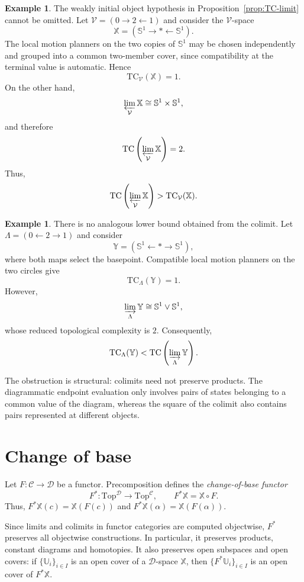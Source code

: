 \documentclass[12pt]{amsart}
\theoremstyle{definition}
\newtheorem{ex}[teo]{Example}
\theoremstyle{remark}
\numberwithin{figure}{section}%
\newcommand{\CC}{\mathcal{C}}
\newcommand{\TC}{\mathrm{TC}}
\newcommand{\Dc}{\mathcal{D}}
\newcommand{\Top}{\mathrm{Top}}
\newcommand{\X}{\mathbb{X}}
\newcommand{\Y}{\mathbb{Y}}
\newcommand{\Uu}{\mathbb{U}}
\begin{document}
\begin{ex}\label{ex:inverse-limit-without-weakly-initial}
The weakly initial object hypothesis in
Proposition~\ref{prop:TC-limit} cannot be omitted. Let
$\mathcal V=(0\to2\leftarrow1)$ and consider the $\mathcal V$-space
\[
\X=
\left(
\mathbb S^1\longrightarrow *\longleftarrow\mathbb S^1
\right).
\]
The local motion planners on the two copies of $\mathbb S^1$ may be
chosen independently and grouped into a common two-member cover, since
compatibility at the terminal value is automatic. Hence
\[
\TC_{\mathcal V}(\X)=1.
\]
On the other hand,
\[
\varprojlim_{\mathcal V}\X
\cong
\mathbb S^1\times\mathbb S^1,
\]
and therefore
\[
\TC\left(\varprojlim_{\mathcal V}\X\right)=2.
\]
Thus,
\[
\TC\left(\varprojlim_{\mathcal V}\X\right)
>
\TC_{\mathcal V}(\X).
\]
\end{ex}

\begin{ex}\label{ex:colimit-does-not-give-lower-bound}
There is no analogous lower bound obtained from the colimit. Let
$\Lambda=(0\leftarrow2\to1)$ and consider
\[
\Y=
\left(
\mathbb S^1\longleftarrow *\longrightarrow\mathbb S^1
\right),
\]
where both maps select the basepoint. Compatible local motion planners
on the two circles give
\[
\TC_{\Lambda}(\Y)=1.
\]
However,
\[
\varinjlim_{\Lambda}\Y
\cong
\mathbb S^1\vee\mathbb S^1,
\]
whose reduced topological complexity is $2$. Consequently,
\[
\TC_{\Lambda}(\Y)
<
\TC\left(\varinjlim_{\Lambda}\Y\right).
\]

The obstruction is structural: colimits need not preserve products.
The diagrammatic endpoint evaluation only involves pairs of states
belonging to a common value of the diagram, whereas the square of the
colimit also contains pairs represented at different objects.
\end{ex}
\section{Change of base}
\label{sec:change-of-base}

Let $F\colon\CC\to\Dc$ be a functor. Precomposition defines the
\emph{change-of-base functor}
\[
F^*\colon\Top^{\Dc}\longrightarrow\Top^{\CC},
\qquad
F^*\X=\X\circ F.
\]
Thus, $F^*\X(c)=\X(F(c))$ and
$F^*\X(\alpha)=\X(F(\alpha))$.

Since limits and colimits in functor categories are computed objectwise,
$F^*$ preserves all objectwise constructions. In particular, it preserves
products, constant diagrams and homotopies. It also preserves open
subspaces and open covers: if $\{\Uu_i\}_{i\in I}$ is an open cover of a
$\Dc$-space $\X$, then $\{F^*\Uu_i\}_{i\in I}$ is an open cover of
$F^*\X$.
\end{document}
